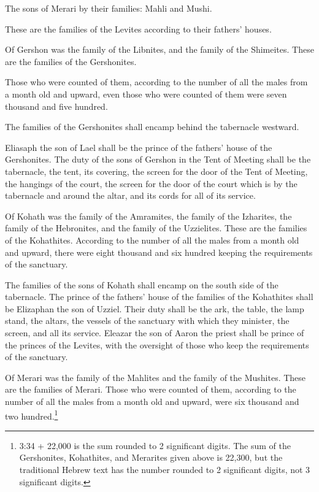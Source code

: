  The sons of Merari by their families: Mahli and Mushi.

These are the families of the Levites according to their fathers'
houses.

 Of Gershon was the family of the Libnites, and the family
of the Shimeites. These are the families of the Gershonites.

 Those who were counted of them, according to the number of
all the males from a month old and upward, even those who were counted
of them were seven thousand and five hundred.

 The families of the Gershonites shall encamp behind the
tabernacle westward.

 Eliasaph the son of Lael shall be the prince of the
fathers' house of the Gershonites.  The duty of the sons of
Gershon in the Tent of Meeting shall be the tabernacle, the tent, its
covering, the screen for the door of the Tent of Meeting, 
the hangings of the court, the screen for the door of the court which is
by the tabernacle and around the altar, and its cords for all of its
service.

 Of Kohath was the family of the Amramites, the family of
the Izharites, the family of the Hebronites, and the family of the
Uzzielites. These are the families of the Kohathites. 
According to the number of all the males from a month old and upward,
there were eight thousand and six hundred keeping the requirements of
the sanctuary.

 The families of the sons of Kohath shall encamp on the
south side of the tabernacle.  The prince of the fathers'
house of the families of the Kohathites shall be Elizaphan the son of
Uzziel.  Their duty shall be the ark, the table, the lamp
stand, the altars, the vessels of the sanctuary with which they
minister, the screen, and all its service.  Eleazar the son
of Aaron the priest shall be prince of the princes of the Levites, with
the oversight of those who keep the requirements of the sanctuary.

 Of Merari was the family of the Mahlites and the family of
the Mushites. These are the families of Merari.  Those who
were counted of them, according to the number of all the males from a
month old and upward, were six thousand and two hundred.\footnote{3:34 +
  22,000 is the sum rounded to 2 significant digits. The sum of the
  Gershonites, Kohathites, and Merarites given above is 22,300, but the
  traditional Hebrew text has the number rounded to 2 significant
  digits, not 3 significant digits.}

